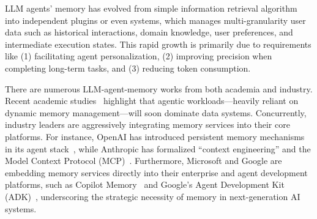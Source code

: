 LLM agents' memory has evolved from simple information retrieval algorithm into independent plugins or even systems, which manages multi-granularity user data such as historical interactions, domain knowledge, user preferences, and intermediate execution states. This rapid growth is primarily due to requirements like (1) facilitating agent personalization, (2) 
improving precision when completing long-term tasks, and (3) reducing token consumption.  %

There are numerous LLM-agent-memory works from both academia and industry. Recent academic studies~\cite{luo2026data, khan2026rag, liu2026supporting} highlight that agentic workloads—heavily reliant on dynamic memory management—will soon dominate data systems. Concurrently, industry leaders are aggressively integrating memory services into their core platforms. For instance, OpenAI has introduced persistent memory mechanisms in its agent stack~\cite{openai2026agents}, while Anthropic has formalized ``context engineering'' and the Model Context Protocol (MCP)~\cite{anthropic2025context, anthropic2024mcp}. Furthermore, Microsoft and Google are embedding memory services directly into their enterprise and agent development platforms, such as Copilot Memory~\cite{microsoft2025copilot} and Google's Agent Development Kit (ADK)~\cite{google2025adk}, underscoring the strategic necessity of memory in next-generation AI systems.






